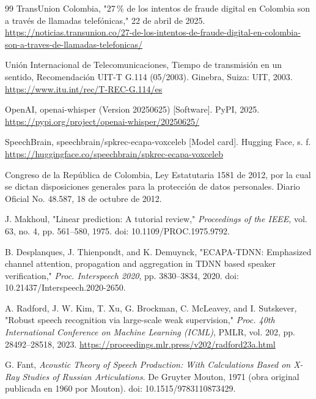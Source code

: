 \documentclass[10pt,twocolumn]{article}
\begin{document}
\begin{thebibliography}{99}
TransUnion Colombia, "27\,\% de los intentos de fraude digital en Colombia son a través de llamadas telefónicas," 22 de abril de 2025. \url{https://noticias.transunion.co/27-de-los-intentos-de-fraude-digital-en-colombia-son-a-traves-de-llamadas-telefonicas/}

Unión Internacional de Telecomunicaciones, Tiempo de transmisión en un sentido, Recomendación UIT-T G.114 (05/2003). Ginebra, Suiza: UIT, 2003. \url{https://www.itu.int/rec/T-REC-G.114/es}

OpenAI, openai-whisper (Version 20250625) [Software]. PyPI, 2025. \url{https://pypi.org/project/openai-whisper/20250625/}

SpeechBrain, speechbrain/spkrec-ecapa-voxceleb [Model card]. Hugging Face, s. f. \url{https://huggingface.co/speechbrain/spkrec-ecapa-voxceleb}

Congreso de la República de Colombia, Ley Estatutaria 1581 de 2012, por la cual se dictan disposiciones generales para la protección de datos personales. Diario Oficial No. 48.587, 18 de octubre de 2012.

J. Makhoul, "Linear prediction: A tutorial review," \textit{Proceedings of the IEEE}, vol. 63, no. 4, pp. 561--580, 1975. doi: 10.1109/PROC.1975.9792.

B. Desplanques, J. Thienpondt, and K. Demuynck, "ECAPA-TDNN: Emphasized channel attention, propagation and aggregation in TDNN based speaker verification," \textit{Proc. Interspeech 2020}, pp. 3830--3834, 2020. doi: 10.21437/Interspeech.2020-2650.

A. Radford, J. W. Kim, T. Xu, G. Brockman, C. McLeavey, and I. Sutskever, "Robust speech recognition via large-scale weak supervision," \textit{Proc. 40th International Conference on Machine Learning (ICML)}, PMLR, vol. 202, pp. 28492--28518, 2023. \url{https://proceedings.mlr.press/v202/radford23a.html}

G. Fant, \textit{Acoustic Theory of Speech Production: With Calculations Based on X-Ray Studies of Russian Articulations}. De Gruyter Mouton, 1971 (obra original publicada en 1960 por Mouton). doi: 10.1515/9783110873429.


\end{thebibliography}
\end{document}
